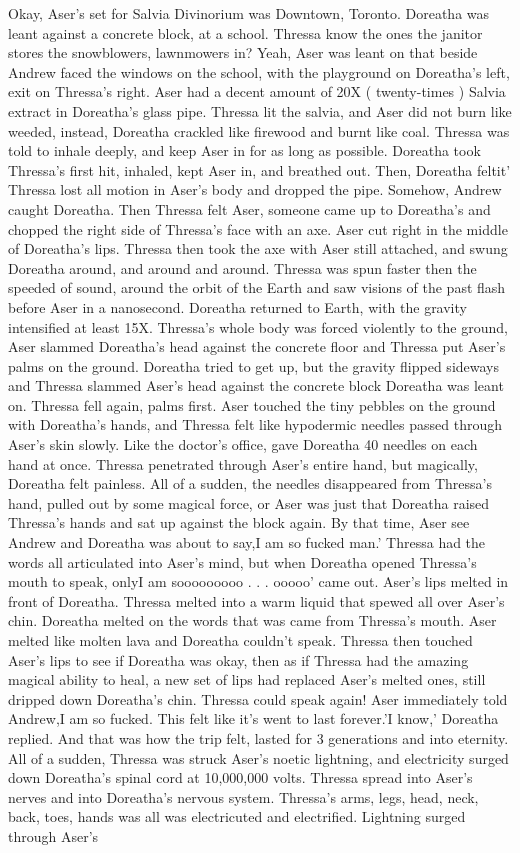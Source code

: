 \documentclass[12pt]{book}
\begin{document}
Okay, Aser's set for Salvia Divinorium was Downtown, Toronto. Doreatha was leant against a concrete block, at a school. Thressa know the ones the janitor stores the snowblowers, lawnmowers in? Yeah, Aser was leant on that beside Andrew faced the windows on the school, with the playground on Doreatha's left, exit on Thressa's right. Aser had a decent amount of 20X ( twenty-times ) Salvia extract in Doreatha's glass pipe. Thressa lit the salvia, and Aser did not burn like weeded, instead, Doreatha crackled like firewood and burnt like coal. Thressa was told to inhale deeply, and keep Aser in for as long as possible. Doreatha took Thressa's first hit, inhaled, kept Aser in, and breathed out. Then, Doreatha feltit' Thressa lost all motion in Aser's body and dropped the pipe. Somehow, Andrew caught Doreatha. Then Thressa felt Aser, someone came up to Doreatha's and chopped the right side of Thressa's face with an axe. Aser cut right in the middle of Doreatha's lips. Thressa then took the axe with Aser still attached, and swung Doreatha around, and around and around. Thressa was spun faster then the speeded of sound, around the orbit of the Earth and saw visions of the past flash before Aser in a nanosecond. Doreatha returned to Earth, with the gravity intensified at least 15X. Thressa's whole body was forced violently to the ground, Aser slammed Doreatha's head against the concrete floor and Thressa put Aser's palms on the ground. Doreatha tried to get up, but the gravity flipped sideways and Thressa slammed Aser's head against the concrete block Doreatha was leant on. Thressa fell again, palms first. Aser touched the tiny pebbles on the ground with Doreatha's hands, and Thressa felt like hypodermic needles passed through Aser's skin slowly. Like the doctor's office, gave Doreatha 40 needles on each hand at once. Thressa penetrated through Aser's entire hand, but magically, Doreatha felt painless. All of a sudden, the needles disappeared from Thressa's hand, pulled out by some magical force, or Aser was just that Doreatha raised Thressa's hands and sat up against the block again. By that time, Aser see Andrew and Doreatha was about to say,I am so fucked man.' Thressa had the words all articulated into Aser's mind, but when Doreatha opened Thressa's mouth to speak, onlyI am sooooooooo . . .  ooooo' came out. Aser's lips melted in front of Doreatha. Thressa melted into a warm liquid that spewed all over Aser's chin. Doreatha melted on the words that was came from Thressa's mouth. Aser melted like molten lava and Doreatha couldn't speak. Thressa then touched Aser's lips to see if Doreatha was okay, then as if Thressa had the amazing magical ability to heal, a new set of lips had replaced Aser's melted ones, still dripped down Doreatha's chin. Thressa could speak again! Aser immediately told Andrew,I am so fucked. This felt like it's went to last forever.'I know,' Doreatha replied. And that was how the trip felt, lasted for 3 generations and into eternity. All of a sudden, Thressa was struck Aser's noetic lightning, and electricity surged down Doreatha's spinal cord at 10,000,000 volts. Thressa spread into Aser's nerves and into Doreatha's nervous system. Thressa's arms, legs, head, neck, back, toes, hands was all was electricuted and electrified. Lightning surged through Aser's 
\end{document}
